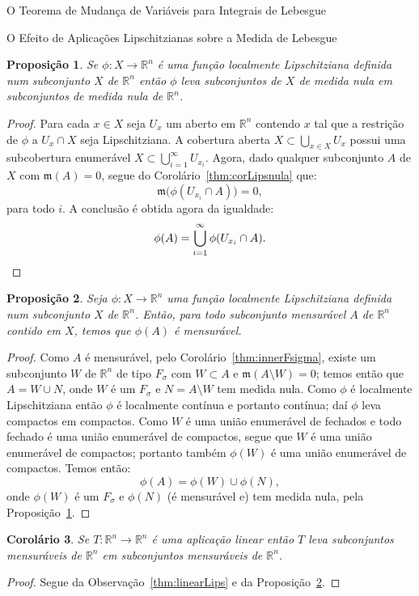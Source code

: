 \documentclass[oneside,final,11pt]{amsbook}
\newcommand{\R}{\mathds R}
\newcommand{\leb}{\mathfrak m}
\theoremstyle{remark}\newtheorem{exercise}{Exercício}[chapter]
\theoremstyle{remark}\newtheorem{*exercise}[exercise]{\hbox to 0pt{\hskip 0pt minus 1fil*}Exercício}
\theoremstyle{definition}\newtheorem{exdefin}{Definição}[chapter]
\theoremstyle{plain}\newtheorem{teo}{Teorema}[section]
\theoremstyle{plain}\newtheorem{lem}[teo]{Lema}
\theoremstyle{plain}\newtheorem{prop}[teo]{Proposição}
\theoremstyle{plain}\newtheorem{cor}[teo]{Corolário}
\theoremstyle{definition}\newtheorem{defin}[teo]{Definição}
\theoremstyle{remark}\newtheorem{rem}[teo]{Observação}
\theoremstyle{definition}\newtheorem{notation}[teo]{Notação}
\theoremstyle{definition}\newtheorem{convention}[teo]{Convenção}
\theoremstyle{definition}\newtheorem{example}[teo]{Exemplo}
\numberwithin{section}{chapter}
\numberwithin{equation}{section}
\begin{document}
\begin{chapter}{O Teorema de Mudança de Variáveis para Integrais de Lebesgue}
\begin{section}{O Efeito de Aplicações Lipschitzianas sobre a Medida de Lebesgue}
\begin{prop}\label{thm:proplocLips}
Se $\phi:X\to\R^n$ é uma função localmente Lipschitziana definida num subconjunto $X$ de $\R^n$ então $\phi$ leva
subconjuntos de $X$ de medida nula em subconjuntos de medida nula de $\R^n$.
\end{prop}
\begin{proof}
Para cada $x\in X$ seja $U_x$ um aberto em $\R^n$ contendo $x$ tal que a restrição de $\phi$ a $U_x\cap X$ seja
Lipschitziana. A cobertura aberta $X\subset\bigcup_{x\in X}U_x$ possui uma subcobertura enumerável
$X\subset\bigcup_{i=1}^\infty U_{x_i}$. Agora, dado qualquer subconjunto $A$ de $X$ com $\leb(A)=0$, segue
do Corolário~\ref{thm:corLipsnula} que:
\[\leb\big(\phi(U_{x_i}\cap A)\big)=0,\]
para todo $i$. A conclusão é obtida agora da igualdade:
\[\phi(A)=\bigcup_{i=1}^\infty\phi(U_{x_i}\cap A).\qedhere\]
\end{proof}

\begin{prop}\label{thm:propmenslocLips}
Seja $\phi:X\to\R^n$ uma função localmente Lipschitziana definida num subconjunto
$X$ de $\R^n$. Então, para todo subconjunto mensurável $A$ de $\R^n$ contido em $X$, temos que
$\phi(A)$ é mensurável.
\end{prop}
\begin{proof}
Como $A$ é mensurável, pelo Corolário~\ref{thm:innerFsigma}, existe um subconjunto $W$ de $\R^n$ de tipo $F_\sigma$
com $W\subset A$ e $\leb(A\setminus W)=0$; temos então que $A=W\cup N$, onde $W$ é um $F_\sigma$
e $N=A\setminus W$ tem medida nula. Como $\phi$ é localmente Lipschitziana então $\phi$
é localmente contínua e portanto contínua; daí $\phi$ leva compactos em compactos. Como
$W$ é uma união enumerável de fechados e todo fechado é uma união enumerável de compactos,
segue que $W$ é uma união enumerável de compactos; portanto também $\phi(W)$ é uma união enumerável
de compactos. Temos então:
\[\phi(A)=\phi(W)\cup\phi(N),\]
onde $\phi(W)$ é um $F_\sigma$ e $\phi(N)$ (é mensurável e) tem medida nula,
pela Proposição~\ref{thm:proplocLips}.
\end{proof}

\begin{cor}\label{thm:linearmenstomens}
Se $T:\R^n\to\R^n$ é uma aplicação linear então $T$ leva subconjuntos mensuráveis de $\R^n$ em subconjuntos
mensuráveis de $\R^n$.
\end{cor}
\begin{proof}
Segue da Observação~\ref{thm:linearLips} e da Proposição~\ref{thm:propmenslocLips}.
\end{proof}


\end{section}
\end{chapter}
\end{document}

